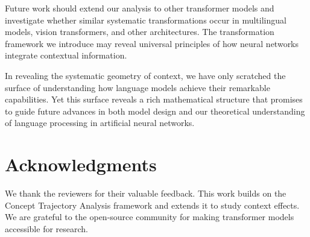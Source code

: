 \documentclass[11pt]{article}
\begin{document}
Future work should extend our analysis to other transformer models and investigate whether similar systematic transformations occur in multilingual models, vision transformers, and other architectures. The transformation framework we introduce may reveal universal principles of how neural networks integrate contextual information.

In revealing the systematic geometry of context, we have only scratched the surface of understanding how language models achieve their remarkable capabilities. Yet this surface reveals a rich mathematical structure that promises to guide future advances in both model design and our theoretical understanding of language processing in artificial neural networks.

\section*{Acknowledgments}
We thank the reviewers for their valuable feedback. This work builds on the Concept Trajectory Analysis framework and extends it to study context effects. We are grateful to the open-source community for making transformer models accessible for research.



\end{document}
